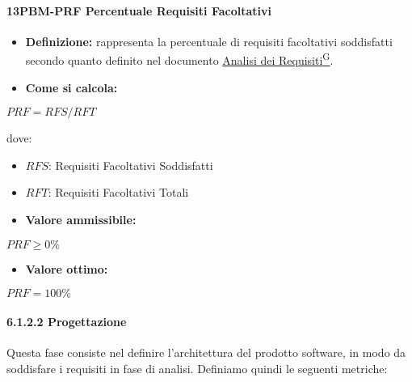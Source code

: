 \paragraph*{13PBM-PRF Percentuale Requisiti Facoltativi}
\begin{itemize}
    \item \textbf{Definizione:} rappresenta la percentuale di requisiti facoltativi soddisfatti secondo quanto definito nel documento \href{https://code7crusaders.github.io/docs/RTB/documentazione_interna/glossario.html#analisi-dei-requisiti}{Analisi dei Requisiti\textsuperscript{G}}.
    \item \textbf{Come si calcola:}
\end{itemize}
\begin{center}
   $PRF = RFS/RFT$ 
\end{center}
dove:
\begin{itemize}[label=$\rightarrow$]
    \item $RFS$: Requisiti Facoltativi Soddisfatti
    \item $RFT$: Requisiti Facoltativi Totali
\end{itemize}
\begin{itemize}
    \item \textbf{Valore ammissibile:}
\end{itemize}
\begin{center}
    $PRF \geq 0\%$
\end{center}
\begin{itemize}
    \item \textbf{Valore ottimo:}
\end{itemize}
\begin{center}
    $PRF = 100\%$
\end{center}

\paragraph*{6.1.2.2 Progettazione}
Questa fase consiste nel definire l'architettura  del prodotto software, in modo da soddisfare i requisiti in fase di analisi. Definiamo quindi le seguenti metriche:

